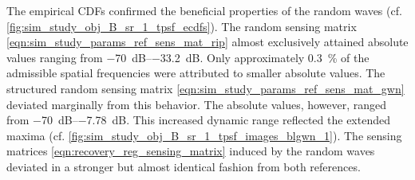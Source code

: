 The empirical \acp{CDF} confirmed
the beneficial properties of
the random waves
(cf. \cref{fig:sim_study_obj_B_sr_1_tpsf_ecdfs}).
The random sensing matrix
\eqref{eqn:sim_study_params_ref_sens_mat_rip} almost exclusively attained
absolute values ranging from
\SIrange{-70}{-33.2}{\deci\bel}.
Only approximately \SI{0.3}{\percent} of
the admissible spatial frequencies were attributed to
smaller absolute values.
The structured random sensing matrix
\eqref{eqn:sim_study_params_ref_sens_mat_gwn} deviated
marginally from
this behavior.
The absolute values, however, ranged from
\SIrange{-70}{-7.78}{\deci\bel}.
This increased dynamic range reflected
the extended maxima
(cf. \cref{fig:sim_study_obj_B_sr_1_tpsf_images_blgwn_1}).
The sensing matrices
\eqref{eqn:recovery_reg_sensing_matrix} induced by
the random waves deviated in
a stronger but almost identical fashion from
both references.
